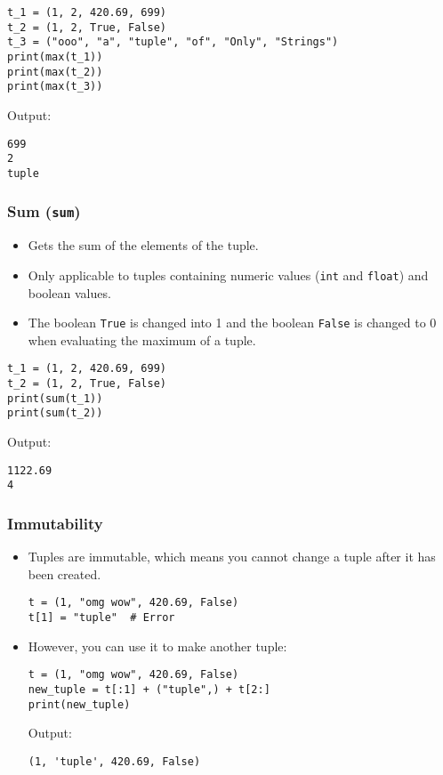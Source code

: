 \documentclass[11pt]{article}
\begin{document}
\begin{verbatim}
t_1 = (1, 2, 420.69, 699)
t_2 = (1, 2, True, False)
t_3 = ("ooo", "a", "tuple", "of", "Only", "Strings")
print(max(t_1))
print(max(t_2))
print(max(t_3))
\end{verbatim}

 \noindent Output:

\begin{verbatim}
699
2
tuple
\end{verbatim}

\subsubsection{Sum (\texttt{sum})}
\label{sec:orge495dfd}
\begin{itemize}
\item Gets the sum of the elements of the tuple.
\item Only applicable to tuples containing numeric values (\texttt{int} and \texttt{float}) and boolean values.
\item The boolean \texttt{True} is changed into 1 and the boolean \texttt{False} is changed to 0 when evaluating the maximum of a tuple.
\end{itemize}

\begin{verbatim}
t_1 = (1, 2, 420.69, 699)
t_2 = (1, 2, True, False)
print(sum(t_1))
print(sum(t_2))
\end{verbatim}

 \noindent Output:

\begin{verbatim}
1122.69
4
\end{verbatim}

\subsubsection{Immutability}
\label{sec:org6b3da1c}
\begin{itemize}
\item Tuples are immutable, which means you cannot change a tuple after it has been created.
\begin{verbatim}
t = (1, "omg wow", 420.69, False)
t[1] = "tuple"  # Error
\end{verbatim}

\item However, you can use it to make another tuple:
\begin{verbatim}
t = (1, "omg wow", 420.69, False)
new_tuple = t[:1] + ("tuple",) + t[2:]
print(new_tuple)
\end{verbatim}

 \noindent Output:

\begin{verbatim}
(1, 'tuple', 420.69, False)
\end{verbatim}
\end{itemize}
\end{document}
